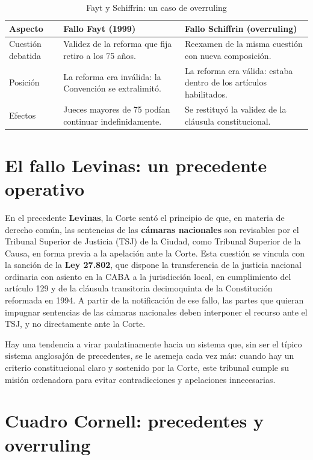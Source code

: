 \documentclass[12pt,oneside]{book}
\begin{document}
\begin{table}[H]
\centering
\small
\caption{Fayt y Schiffrin: un caso de overruling}
\begin{tabularx}{\textwidth}{Q{0.22\textwidth}YY}
\toprule
\textbf{Aspecto} & \textbf{Fallo Fayt (1999)} & \textbf{Fallo Schiffrin (overruling)} \\
\midrule
Cuestión debatida & Validez de la reforma que fija retiro a los 75 años. & Reexamen de la misma cuestión con nueva composición. \\
Posición & La reforma era inválida: la Convención se extralimitó. & La reforma era válida: estaba dentro de los artículos habilitados. \\
Efectos & Jueces mayores de 75 podían continuar indefinidamente. & Se restituyó la validez de la cláusula constitucional. \\
\bottomrule
\end{tabularx}
\end{table}

\section{El fallo Levinas: un precedente operativo}

En el precedente \textbf{Levinas}, la Corte sentó el principio de que, en materia de derecho común, las sentencias de las \textbf{cámaras nacionales} son revisables por el Tribunal Superior de Justicia (TSJ) de la Ciudad, como Tribunal Superior de la Causa, en forma previa a la apelación ante la Corte. Esta cuestión se vincula con la sanción de la \textbf{Ley 27.802}, que dispone la transferencia de la justicia nacional ordinaria con asiento en la CABA a la jurisdicción local, en cumplimiento del artículo 129 y de la cláusula transitoria decimoquinta de la Constitución reformada en 1994. A partir de la notificación de ese fallo, las partes que quieran impugnar sentencias de las cámaras nacionales deben interponer el recurso ante el TSJ, y no directamente ante la Corte.

\begin{important}
Hay una tendencia a virar paulatinamente hacia un sistema que, sin ser el típico sistema anglosajón de precedentes, se le asemeja cada vez más: cuando hay un criterio constitucional claro y sostenido por la Corte, este tribunal cumple su misión ordenadora para evitar contradicciones y apelaciones innecesarias.
\end{important}

\section{Cuadro Cornell: precedentes y overruling}
\end{document}
